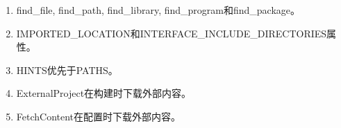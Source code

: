 

\begin{enumerate}
\item 
find\_file, find\_path, find\_library, find\_program和find\_package。

\item
IMPORTED\_LOCATION和INTERFACE\_INCLUDE\_DIRECTORIES属性。

\item 
HINTS优先于PATHS。

\item 
ExternalProject在构建时下载外部内容。

\item 
FetchContent在配置时下载外部内容。
\end{enumerate}